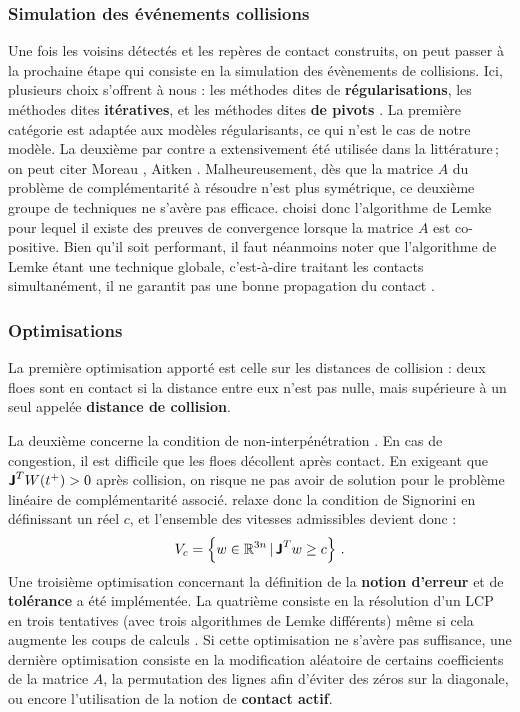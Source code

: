 \subsubsection{Simulation des événements collisions}

Une fois les voisins détectés et les repères de contact construits, on peut passer à la prochaine étape qui consiste en la simulation des évènements de collisions. Ici, plusieurs choix s'offrent à nous : les méthodes dites de \textbf{régularisations}, les méthodes dites \textbf{itératives}, et les méthodes dites \textbf{de pivots} \parencite[p.82]{rabatel2015thesis}. La première catégorie est adaptée aux modèles régularisants, ce qui n'est le cas de notre modèle. La deuxième par contre a extensivement été utilisée dans la littérature ; on peut citer Moreau \parencite{moreau1988unilateral,moreau1999numerical,jean1999non}, Aitken \parencite{aitken1950iv}. Malheureusement, dès que la matrice $A$ du problème de complémentarité à résoudre n'est plus symétrique, ce deuxième groupe de techniques ne s'avère pas efficace. \citeauthor{rabatel2015thesis} choisi donc l'algorithme de Lemke pour lequel il existe des preuves de convergence lorsque la matrice $A$ est co-positive. Bien qu'il soit performant, il faut néanmoins noter que l’algorithme de Lemke étant une technique globale, c’est-à-dire traitant les contacts simultanément, il ne garantit pas une bonne propagation du contact \parencite[p.82]{rabatel2015thesis}.

\subsubsection{Optimisations}

La première optimisation apporté est celle sur les distances de collision : deux floes sont en contact si la distance entre eux n'est pas nulle, mais supérieure à un seul appelée \textbf{distance de collision}.

La deuxième concerne la condition de non-interpénétration \parencite[p.85]{rabatel2015thesis}. En cas de congestion, il est difficile que les floes décollent après contact. En exigeant que $\bm{\mathsf{J}}^T W(t^+) > 0$ après collision, on risque ne pas avoir de solution pour le problème linéaire de complémentarité associé. \citeauthor{rabatel2015thesis} relaxe donc la condition de Signorini en définissant un réel $c$, et l'ensemble des vitesses admissibles devient donc :
$$
V_c = \left\{ w \in \mathbb{R}^{3n} \, | \, \bm{\mathsf{J}}^T w \geq c \right\} \,.
$$
Une troisième optimisation concernant la définition de la \textbf{notion d'erreur} et de \textbf{tolérance} a été implémentée. La quatrième consiste en la résolution d'un LCP en trois tentatives (avec trois algorithmes de Lemke différents) même si cela augmente les coups de calculs \parencite[p.86]{rabatel2015thesis}. Si cette optimisation ne s'avère pas suffisance, une dernière optimisation consiste en la modification aléatoire de certains coefficients de la matrice $A$, la permutation des lignes afin d'éviter des zéros sur la diagonale, ou encore l'utilisation de la notion de \textbf{contact actif}.


